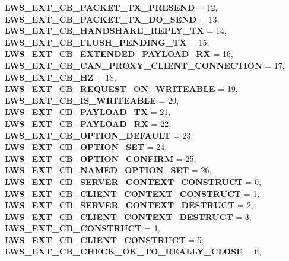 \begin{DoxyCompactItemize}
{\bfseries L\+W\+S\+\_\+\+E\+X\+T\+\_\+\+C\+B\+\_\+\+P\+A\+C\+K\+E\+T\+\_\+\+T\+X\+\_\+\+P\+R\+E\+S\+E\+ND} = 12, 
{\bfseries L\+W\+S\+\_\+\+E\+X\+T\+\_\+\+C\+B\+\_\+\+P\+A\+C\+K\+E\+T\+\_\+\+T\+X\+\_\+\+D\+O\+\_\+\+S\+E\+ND} = 13, 
{\bfseries L\+W\+S\+\_\+\+E\+X\+T\+\_\+\+C\+B\+\_\+\+H\+A\+N\+D\+S\+H\+A\+K\+E\+\_\+\+R\+E\+P\+L\+Y\+\_\+\+TX} = 14, 
\newline
{\bfseries L\+W\+S\+\_\+\+E\+X\+T\+\_\+\+C\+B\+\_\+\+F\+L\+U\+S\+H\+\_\+\+P\+E\+N\+D\+I\+N\+G\+\_\+\+TX} = 15, 
{\bfseries L\+W\+S\+\_\+\+E\+X\+T\+\_\+\+C\+B\+\_\+\+E\+X\+T\+E\+N\+D\+E\+D\+\_\+\+P\+A\+Y\+L\+O\+A\+D\+\_\+\+RX} = 16, 
{\bfseries L\+W\+S\+\_\+\+E\+X\+T\+\_\+\+C\+B\+\_\+\+C\+A\+N\+\_\+\+P\+R\+O\+X\+Y\+\_\+\+C\+L\+I\+E\+N\+T\+\_\+\+C\+O\+N\+N\+E\+C\+T\+I\+ON} = 17, 
{\bfseries L\+W\+S\+\_\+\+E\+X\+T\+\_\+\+C\+B\+\_\+HZ} = 18, 
\newline
{\bfseries L\+W\+S\+\_\+\+E\+X\+T\+\_\+\+C\+B\+\_\+\+R\+E\+Q\+U\+E\+S\+T\+\_\+\+O\+N\+\_\+\+W\+R\+I\+T\+E\+A\+B\+LE} = 19, 
{\bfseries L\+W\+S\+\_\+\+E\+X\+T\+\_\+\+C\+B\+\_\+\+I\+S\+\_\+\+W\+R\+I\+T\+E\+A\+B\+LE} = 20, 
{\bfseries L\+W\+S\+\_\+\+E\+X\+T\+\_\+\+C\+B\+\_\+\+P\+A\+Y\+L\+O\+A\+D\+\_\+\+TX} = 21, 
{\bfseries L\+W\+S\+\_\+\+E\+X\+T\+\_\+\+C\+B\+\_\+\+P\+A\+Y\+L\+O\+A\+D\+\_\+\+RX} = 22, 
\newline
{\bfseries L\+W\+S\+\_\+\+E\+X\+T\+\_\+\+C\+B\+\_\+\+O\+P\+T\+I\+O\+N\+\_\+\+D\+E\+F\+A\+U\+LT} = 23, 
{\bfseries L\+W\+S\+\_\+\+E\+X\+T\+\_\+\+C\+B\+\_\+\+O\+P\+T\+I\+O\+N\+\_\+\+S\+ET} = 24, 
{\bfseries L\+W\+S\+\_\+\+E\+X\+T\+\_\+\+C\+B\+\_\+\+O\+P\+T\+I\+O\+N\+\_\+\+C\+O\+N\+F\+I\+RM} = 25, 
{\bfseries L\+W\+S\+\_\+\+E\+X\+T\+\_\+\+C\+B\+\_\+\+N\+A\+M\+E\+D\+\_\+\+O\+P\+T\+I\+O\+N\+\_\+\+S\+ET} = 26, 
\newline
{\bfseries L\+W\+S\+\_\+\+E\+X\+T\+\_\+\+C\+B\+\_\+\+S\+E\+R\+V\+E\+R\+\_\+\+C\+O\+N\+T\+E\+X\+T\+\_\+\+C\+O\+N\+S\+T\+R\+U\+CT} = 0, 
{\bfseries L\+W\+S\+\_\+\+E\+X\+T\+\_\+\+C\+B\+\_\+\+C\+L\+I\+E\+N\+T\+\_\+\+C\+O\+N\+T\+E\+X\+T\+\_\+\+C\+O\+N\+S\+T\+R\+U\+CT} = 1, 
{\bfseries L\+W\+S\+\_\+\+E\+X\+T\+\_\+\+C\+B\+\_\+\+S\+E\+R\+V\+E\+R\+\_\+\+C\+O\+N\+T\+E\+X\+T\+\_\+\+D\+E\+S\+T\+R\+U\+CT} = 2, 
{\bfseries L\+W\+S\+\_\+\+E\+X\+T\+\_\+\+C\+B\+\_\+\+C\+L\+I\+E\+N\+T\+\_\+\+C\+O\+N\+T\+E\+X\+T\+\_\+\+D\+E\+S\+T\+R\+U\+CT} = 3, 
\newline
{\bfseries L\+W\+S\+\_\+\+E\+X\+T\+\_\+\+C\+B\+\_\+\+C\+O\+N\+S\+T\+R\+U\+CT} = 4, 
{\bfseries L\+W\+S\+\_\+\+E\+X\+T\+\_\+\+C\+B\+\_\+\+C\+L\+I\+E\+N\+T\+\_\+\+C\+O\+N\+S\+T\+R\+U\+CT} = 5, 
{\bfseries L\+W\+S\+\_\+\+E\+X\+T\+\_\+\+C\+B\+\_\+\+C\+H\+E\+C\+K\+\_\+\+O\+K\+\_\+\+T\+O\+\_\+\+R\+E\+A\+L\+L\+Y\+\_\+\+C\+L\+O\+SE} = 6, 

\end{DoxyCompactItemize}
